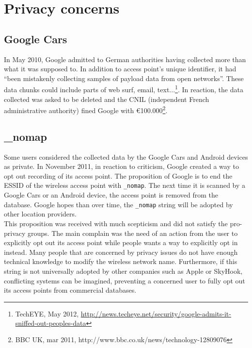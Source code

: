 
\section{Privacy concerns}
\label{sec:andro-priv}

\subsection{Google Cars}
In May 2010, Google admitted to German authorities having collected more than what it was supposed to.
In addition to access point's unique identifier, it had ``been mistakenly collecting samples of payload data from open networks''.
These data chunks could include parts of web surf, email, text...\footnote{TechEYE, May 2012, \url{http://news.techeye.net/security/google-admits-it-sniffed-out-peoples-data}}.
In reaction, the data collected was asked to be deleted and the CNIL (independent French administrative authority) fined Google with €100.000\footnote{BBC UK, mar 2011, http://www.bbc.co.uk/news/technology-12809076}.\\

\subsection{\_nomap}

Some users considered the collected data by the Google Cars and Android devices as private.
In November 2011, in reaction to criticism, Google created a way to opt out recording of its access point.
The proposition of Google is to end the ESSID of the wireless access point with \texttt{\_nomap}.
The next time it is scanned by a Google Cars or an Android device, the access point is removed from the database.
Google hopes than over time, the \texttt{\_nomap} string will be adopted by other location providers\cite{nomap}.\\

This proposition was received with much scepticism and did not satisfy the pro-privacy groups.
The main complain was the need of an action from the user to explicitly opt out its access point while people wants a way to explicitly opt in instead.
Many people that are concerned by privacy issues do not have enough technical knowledge to modify the wireless network name.
Furthermore, if this string is not universally adopted by other companies such as Apple or SkyHook, conflicting systems can be imagined, preventing a concerned user to fully opt out its access points from commercial databases.

